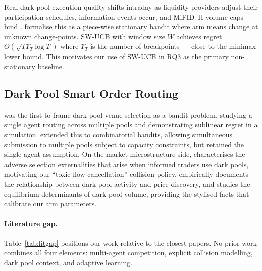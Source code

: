 \documentclass[11pt]{article}
\begin{document}
Real dark pool execution quality shifts intraday as liquidity providers
adjust their participation schedules, information events occur, and
MiFID~II volume caps bind \citep{buti2017}.
\citet{garivier2011} formalise this as a piece-wise stationary bandit
where arm means change at unknown change-points.
SW-UCB with window size $W$ achieves regret $O(\sqrt{T \Upsilon_T \log T})$
where $\Upsilon_T$ is the number of breakpoints --- close to the minimax
lower bound.
This motivates our use of SW-UCB in RQ3 as the primary non-stationary
baseline.

\subsection{Dark Pool Smart Order Routing}

\citet{ganchev2010} was the first to frame dark pool venue selection as a
bandit problem, studying a single agent routing across multiple pools and
demonstrating sublinear regret in a simulation.
\citet{bernasconi2022} extended this to combinatorial bandits, allowing
simultaneous submission to multiple pools subject to capacity constraints,
but retained the single-agent assumption.
On the market microstructure side, \citet{zhu2014} characterises the
adverse selection externalities that arise when informed traders use dark
pools, motivating our ``toxic-flow cancellation'' collision policy.
\citet{foley2016dark} empirically documents the relationship between dark
pool activity and price discovery, and \citet{buti2017} studies the
equilibrium determinants of dark pool volume, providing the stylised facts
that calibrate our arm parameters.

\paragraph{Literature gap.}
Table~\ref{tab:litgap} positions our work relative to the closest papers.
No prior work combines all four elements: multi-agent competition,
explicit collision modelling, dark pool context, and adaptive learning.
\end{document}
